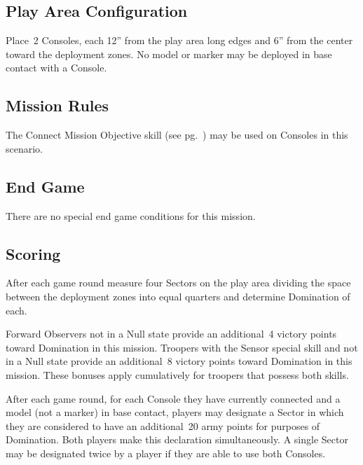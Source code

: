 \label{mission:sweepandclear}

\subsection{Play Area Configuration}

Place~2 Consoles, each 12'' from the play area long edges and 6'' from
the center toward the deployment zones.  No model or marker may be
deployed in base contact with a Console.

\subsection{Mission Rules}

The Connect Mission Objective skill (see
pg.~\pageref{sec:hack-objective}) may be used on Consoles in this
scenario.


\subsection{End Game}

There are no special end game conditions for this mission.


\subsection{Scoring}


  After each game round measure four
Sectors on the play area dividing the space between the deployment
zones into equal quarters and determine Domination of each.

 Forward Observers not in a Null state
provide an additional~4 victory points toward Domination in this
mission.  Troopers with the Sensor special skill and not in a Null
state provide an additional~8 victory points toward Domination in this
mission. These bonuses apply cumulatively for troopers that possess
both skills.

  After each game round, for each
Console they have currently connected and a model (not a marker) in
base contact, players may designate a Sector in which they are
considered to have an additional~20 army points for purposes of
Domination.  Both players make this declaration simultaneously.  A
single Sector may be designated twice by a player if they are able to
use both Consoles.

